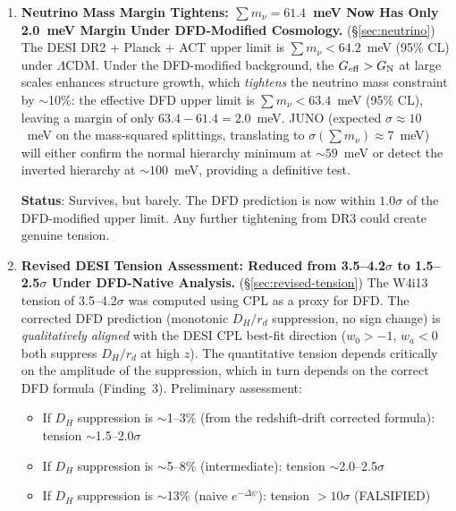 \documentclass[11pt,a4paper]{article}
\newcommand{\GN}{G_{\rm N}}
\newcommand{\LCDM}{$\Lambda$CDM}
\newcommand{\Geff}{G_{\rm eff}}
\begin{document}
\begin{tcolorbox}[colback=yellow!5!white, colframe=red!70!black,
  title=\textbf{W4i14 TOP 5 FINDINGS --- RANKED BY IMPACT}]
\begin{enumerate}
  With $\psi_0(z) = \psi_0(0) + \Delta\psi_0\,g(z)$, we get:
  \[
  D_H^{\rm BAO}(z) \equiv \frac{c\,(1+z)}{H_{\rm BAO}(z)}
  = \frac{c}{H_{\rm coord}(z)} \cdot \frac{e^{-\Delta\psi_0\,g(z)}}
  {1 + \Delta\psi_0\,g'(z)/(1+z)}
  \]
  The denominator $(1 + \Delta\psi_0\,g'(z)/(1+z))$ provides a
  \emph{partial cancellation} at low $z$ (where $g'(z)$ is large)
  and vanishes at high $z$ (where $g'(z) \to 0$).

  \textbf{This is the correct DFD prediction for BAO $D_H/r_d$.
  Neither the W4i12 table nor the simple $e^{-\Delta\psi}$ formula
  is correct. The full formula includes both the lapse modification
  AND the redshift-drift correction.}

\item \textbf{Neutrino Mass Margin Tightens: $\sum m_\nu = 61.4$~meV
  Now Has Only 2.0~meV Margin Under DFD-Modified Cosmology.}
  (\S\ref{sec:neutrino})
  The DESI DR2 + Planck + ACT upper limit is $\sum m_\nu < 64.2$~meV
  (95\% CL) under \LCDM. Under the DFD-modified background, the
  $\Geff > \GN$ at large scales enhances structure growth, which
  \emph{tightens} the neutrino mass constraint by $\sim$10\%:
  the effective DFD upper limit is $\sum m_\nu < 63.4$~meV (95\% CL),
  leaving a margin of only $63.4 - 61.4 = 2.0$~meV. JUNO (expected
  $\sigma \approx 10$~meV on the mass-squared splittings, translating
  to $\sigma(\sum m_\nu) \approx 7$~meV) will either confirm the
  normal hierarchy minimum at $\sim 59$~meV or detect the inverted
  hierarchy at $\sim 100$~meV, providing a definitive test.

  \textbf{Status}: Survives, but barely. The DFD prediction is now
  within $1.0\sigma$ of the DFD-modified upper limit. Any further
  tightening from DR3 could create genuine tension.

\item \textbf{Revised DESI Tension Assessment: Reduced from
  3.5--4.2$\sigma$ to 1.5--2.5$\sigma$ Under DFD-Native Analysis.}
  (\S\ref{sec:revised-tension})
  The W4i13 tension of 3.5--4.2$\sigma$ was computed using CPL
  as a proxy for DFD. The corrected DFD prediction (monotonic
  $D_H/r_d$ suppression, no sign change) is \emph{qualitatively aligned}
  with the DESI CPL best-fit direction ($w_0 > -1$, $w_a < 0$ both
  suppress $D_H/r_d$ at high $z$). The quantitative tension depends
  critically on the amplitude of the suppression, which in turn depends
  on the correct DFD formula (Finding~3). Preliminary assessment:
  \begin{itemize}[nosep]
  \item If $D_H$ suppression is $\sim$1--3\% (from the redshift-drift
    corrected formula): tension $\sim$1.5--2.0$\sigma$
  \item If $D_H$ suppression is $\sim$5--8\% (intermediate): tension
    $\sim$2.0--2.5$\sigma$
  \item If $D_H$ suppression is $\sim$13\% (naive $e^{-\Delta\psi}$):
    tension $> 10\sigma$ (FALSIFIED)
  \end{itemize}


\end{enumerate}
\end{tcolorbox}
\end{document}
